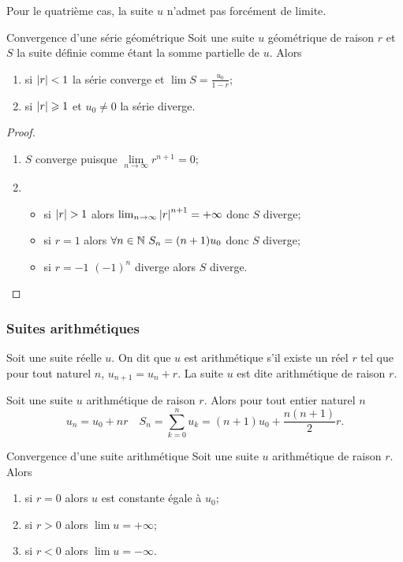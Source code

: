 Pour le quatrième cas, la suite \(u\) n'admet pas forcément de limite.
\begin{prop}{Convergence d'une série géométrique}
  Soit une suite \(u\) géométrique de raison \(r\) et \(S\) la suite définie comme étant la somme partielle de \(u\). Alors
  \begin{enumerate}
  \item si \(\left\lvert r\right\rvert < 1\) la série converge et \(\lim S = \frac{u_0}{1-r}\);
  \item si \(\left\lvert r\right\rvert \geqslant 1\) et \(u_0 \neq 0\) la série diverge.
  \end{enumerate}
\end{prop}
\begin{proof}
  \begin{enumerate}
  \item \(S\) converge puisque \(\lim\limits_{n \to \infty} r^{n+1}=0\);
  \item 
    \begin{itemize} 
    \item si \(\left\lvert r\right\rvert>1\) alors \(\lim_{n \to \infty} \left\lvert r\right\rvert^{n+1}=+\infty\) donc \(S\) diverge;
    \item si \(r=1\) alors \(\forall n \in \mathbb{N} \ S_n=(n+1)u_0\) donc \(S\) diverge;
    \item si \(r=-1\) \((-1)^n\) diverge alors \(S\) diverge.
    \end{itemize}
  \end{enumerate}
\end{proof}

\subsubsection{Suites arithmétiques}

\begin{defdef}
  Soit une suite réelle \(u\). On dit que \(u\) est arithmétique s'il existe un réel \(r\) tel que pour tout naturel \(n\), \(u_{n+1}=u_n +r\). La suite \(u\) est dite arithmétique de raison \(r\).
\end{defdef}
\begin{prop}
  Soit une suite \(u\) arithmétique de raison \(r\). Alors pour tout entier naturel \(n\)
  \begin{equation}
    u_n=u_0+nr \quad S_n=\sum_{k=0}^n u_k = (n+1)u_0 + \frac{n(n+1)}{2}r.
  \end{equation}
\end{prop}
\begin{prop}{Convergence d'une suite arithmétique}
  Soit une suite \(u\) arithmétique de raison \(r\). Alors
  \begin{enumerate}
  \item si \(r=0\) alors \(u\) est constante égale à \(u_0\);
  \item si \(r>0\) alors \(\lim u =+\infty\);
  \item si \(r<0\) alors \(\lim u =-\infty\).
  \end{enumerate}
\end{prop}

